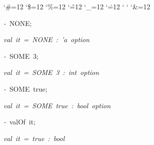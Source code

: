 \begin{list}{}
{\setlength{\leftmargin}{\leftmargini}
\setlength{\rightmargin}{0cm}
\setlength{\itemindent}{0cm}
\setlength{\listparindent}{0cm}
\setlength{\itemsep}{0cm}
\setlength{\parsep}{0cm}
\setlength{\labelsep}{0cm}
\setlength{\labelwidth}{0cm}
\catcode`\#=12
\catcode`\$=12
\catcode`\%=12
\catcode`\^=12
\catcode`\_=12
\catcode`\.=12
\catcode`
\catcode`
\catcode`\&=12
\ttfamily}
\small
\item[]\textsl{-\ }NONE;
\item[]\textsl{val\ it\ =\ NONE\ :\ 'a\ option}
\item[]\textsl{-\ }SOME\ 3;
\item[]\textsl{val\ it\ =\ SOME\ 3\ :\ int\ option}
\item[]\textsl{-\ }SOME\ true;
\item[]\textsl{val\ it\ =\ SOME\ true\ :\ bool\ option}
\item[]\textsl{-\ }valOf\ it;
\item[]\textsl{val\ it\ =\ true\ :\ bool}
\end{list}

